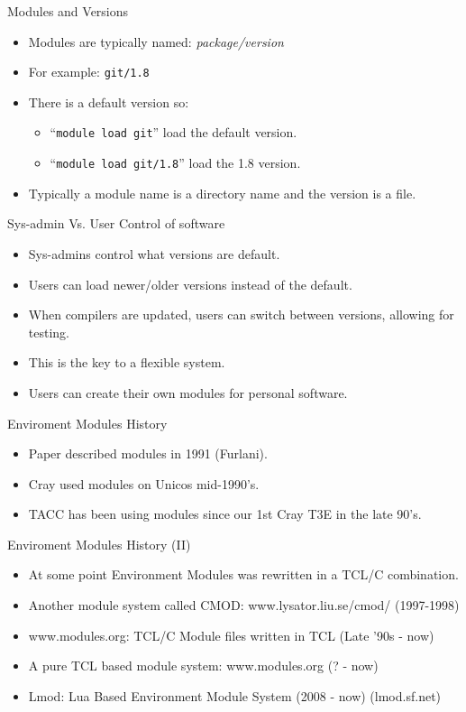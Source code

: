 \documentclass{beamer}
\begin{document}
\begin{frame}{Modules and Versions}
  \begin{itemize}
    \item Modules are typically named: \emph{package/version}
    \item For example: \texttt{git/1.8}
    \item There is a default version so:
      \begin{itemize}
        \item ``\texttt{module load git}'' load the default version.
        \item ``\texttt{module load git/1.8}'' load the 1.8 version.
      \end{itemize}
    \item Typically a module name is a directory name and the version
      is a file.
  \end{itemize}
\end{frame}

\begin{frame}{Sys-admin Vs. User Control of software}
  \begin{itemize}
    \item Sys-admins control what versions are default.
    \item Users can load newer/older versions instead of the default.
    \item When compilers are updated, users can switch between
      versions, allowing for testing.
    \item This is the key to a flexible system.
    \item Users can create their own modules for personal software.
  \end{itemize}
\end{frame}

\begin{frame}{Enviroment Modules History}
  \begin{itemize}
    \item Paper described modules in 1991 (Furlani).
    \item Cray used modules on Unicos mid-1990's.
    \item TACC has been using modules since our 1st Cray T3E in the
      late 90's.
  \end{itemize}
\end{frame}

\begin{frame}{Enviroment Modules History (II)}
  \begin{itemize}
    \item At some point Environment Modules was rewritten in a TCL/C combination.
    \item Another module system called CMOD:
      www.lysator.liu.se/cmod/ (1997-1998)
    \item www.modules.org: TCL/C Module files written in TCL (Late '90s - now)
    \item A pure TCL based module system: www.modules.org (? - now) 
    \item Lmod: Lua Based Environment Module System (2008 - now) (lmod.sf.net)
  \end{itemize}
\end{frame}
\end{document}
